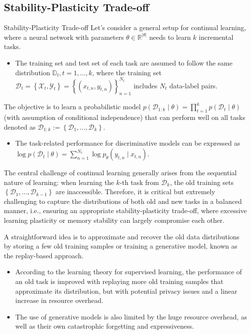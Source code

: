 \documentclass[9pt,dvipsnames]{beamer}
\begin{document}
\subsection{Stability-Plasticity Trade-off}
\begin{frame}{Stability-Plasticity Trade-off}
	Let's consider a general setup for continual learning, where a neural network with parameters $\theta \in \mathbb{R}^{|\theta|}$ needs to learn $k$ incremental tasks. 
	\begin{itemize}
		\item The training set and test set of each task are assumed to follow the same distribution $\mathbb{D}_{t}, t=1, \ldots, k$, where the training set $\mathcal{D}_{t}=\left\{\mathcal{X}_{t}, \mathcal{Y}_{t}\right\}=\left\{\left(x_{t, n}, y_{t, n}\right)\right\}_{n=1}^{N_{t}}$ includes $N_{t}$ data-label pairs.
	\end{itemize}
	 The objective is to learn a probabilistic model $p\left(\mathcal{D}_{1: k} \mid \theta\right)=\prod_{t=1}^{k} p\left(\mathcal{D}_{t} \mid \theta\right)$ (with assumption of conditional independence) that can perform well on all tasks denoted as $\mathcal{D}_{1: k}:=\left\{\mathcal{D}_{1}, \ldots, \mathcal{D}_{k}\right\}$. 
	 \begin{itemize}
	 	\item The task-related performance for discriminative models can be expressed as $\log p\left(\mathcal{D}_{t} \mid \theta\right)=\sum_{n=1}^{N_{t}} \log p_{\theta}\left(y_{t, n} \mid x_{t, n}\right)$. 
	 \end{itemize}
	 The central challenge of continual learning generally arises from the sequential nature of learning: when learning the $k$-th task from $\mathcal{D}_{k}$, the old training sets $\left\{\mathcal{D}_{1}, \ldots, \mathcal{D}_{k-1}\right\}$ are inaccessible. Therefore, it is critical but extremely challenging to capture the distributions of both old and new tasks in a balanced manner, i.e., ensuring an appropriate stability-plasticity trade-off, where excessive learning plasticity or memory stability can largely compromise each other.
\end{frame}

\begin{frame}{}
	A straightforward idea is to approximate and recover the old data distributions by storing a few old training samples or training a generative model, known as the replay-based approach.
	\begin{itemize}
		\item According to the learning theory for supervised learning, the performance of an old task is improved with replaying more old training samples that approximate its distribution, but with potential privacy issues and a linear increase in resource overhead.
		\item The use of generative models is also limited by the huge resource overhead, as well as their own catastrophic forgetting and expressiveness.
	\end{itemize}
\end{frame}
\end{document}
